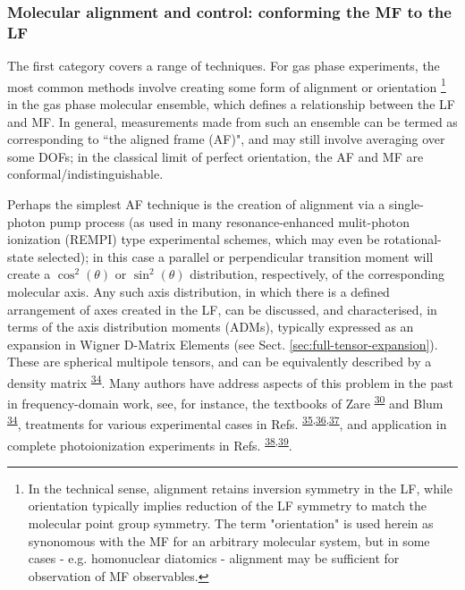 \documentclass[10pt]{article}
\begin{document}
\subsubsection{Molecular alignment and control: conforming the MF to the LF\label{sec:MF-control}}

The first category covers a range of techniques. For gas phase experiments, the most common methods involve creating some form of alignment or orientation \footnote{In the technical sense, alignment retains 
inversion symmetry in the LF, while orientation typically implies reduction of the LF symmetry to match the molecular point group symmetry. The term "orientation" is used herein as synonomous with the MF for an arbitrary molecular system, but in some cases - e.g. homonuclear diatomics - alignment may be sufficient for observation of MF observables.} 
in the gas phase molecular ensemble, which defines a relationship between the LF and MF. In general, measurements made from such an ensemble can be termed as corresponding to ``the aligned frame (AF)", and may still involve averaging over some DOFs; in the 
classical limit of perfect orientation, the AF and MF are conformal/indistinguishable. 

Perhaps the simplest AF technique is the creation of alignment via a single-photon pump process (as used in many resonance-enhanced mulit-photon ionization (REMPI) type experimental schemes, which may even be rotational-state selected); in this case a parallel or perpendicular transition moment will create a $\cos^2(\theta)$ or $\sin^2(\theta)$ distribution, respectively, of the corresponding molecular axis. Any such axis distribution, in which there is a defined arrangement of axes created in the LF, can be discussed, and characterised, in terms of the axis distribution moments (ADMs), typically expressed as an expansion in Wigner D-Matrix Elements (see Sect. \ref{sec:full-tensor-expansion}). These are spherical multipole tensors, and can be equivalently described by a density matrix \textsuperscript{\hyperref[csl:34]{34}}. Many authors have address aspects of this problem in the past in frequency-domain work, see, for instance, the textbooks of Zare \textsuperscript{\hyperref[csl:30]{30}} and Blum \textsuperscript{\hyperref[csl:34]{34}}, treatments for various experimental cases in Refs. \textsuperscript{\hyperref[csl:35]{35},\hyperref[csl:36]{36},\hyperref[csl:37]{37}}, and application in complete photoionization experiments in Refs. \textsuperscript{\hyperref[csl:38]{38},\hyperref[csl:39]{39}}.
\end{document}
